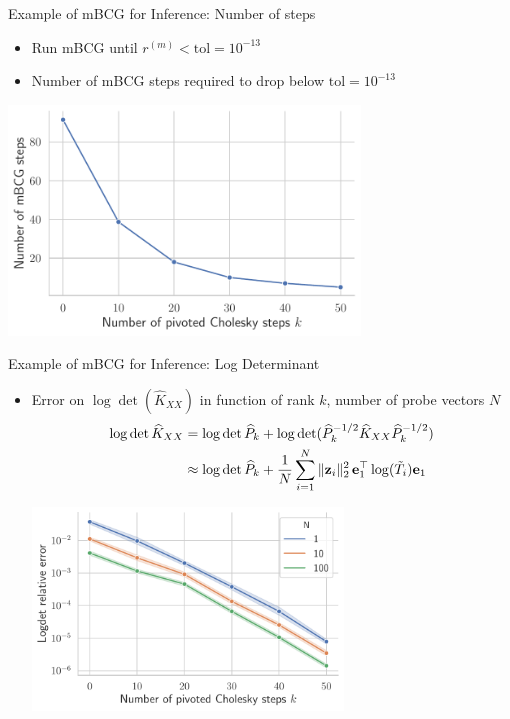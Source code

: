 \documentclass{beamer}
\begin{document}
\begin{frame}{Example of mBCG for Inference: Number of steps}
\begin{itemize}
    \item<1-> Run mBCG until $r^{(m)} < \text{tol}=10^{-13}$
    \item<2-> Number of mBCG steps required to drop below $\text{tol}=10^{-13}$
\end{itemize}
    \begin{center}
        \includegraphics[width=0.7\textwidth]{report/res/inference_steps.pdf}
    \end{center}
\end{frame}


\begin{frame}{Example of mBCG for Inference: Log Determinant}
\begin{itemize}
    \item<1-> Error on $\log \det( \widehat K_{XX})$ in function of rank $k$, number of probe vectors $N$
    \begin{align*}
        \log\det \widehat K_{XX} 
        &= \log\det \widehat P_k + \log\det(\widehat P_k^{-1/2} \widehat K_{XX} \widehat P_k^{-1/2})\\
        &\approx \log\det \widehat P_k + \frac{1}{N} \sum_{i=1}^N \Vert \boldsymbol{\mathbf{z}}_i \Vert_2^2 \, \boldsymbol{\mathbf{e}}_1^\top \log  (\tilde T_i) \boldsymbol{\mathbf{e}}_1
    \end{align*}
    \begin{center}
        \includegraphics[width=0.65\textwidth]{report/res/inference_logdet.pdf}
    \end{center}
\end{itemize}
\end{frame}
\end{document}
